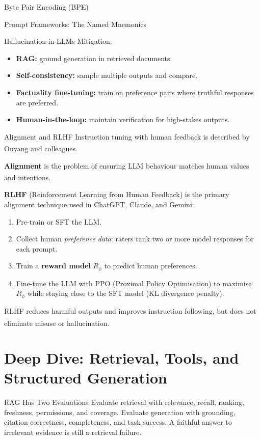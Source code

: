 \begin{v3topic}{Byte Pair Encoding (BPE)}
\begin{v3topic}{Prompt Frameworks: The Named Mnemonics}
\begin{v3topic}{Hallucination in LLMs}
    Mitigation:
    \begin{itemize}
        \item \textbf{RAG:} ground generation in retrieved documents.
        \item \textbf{Self-consistency:} sample multiple outputs and compare.
        \item \textbf{Factuality fine-tuning:} train on preference pairs where truthful
              responses are preferred.
        \item \textbf{Human-in-the-loop:} maintain verification for high-stakes outputs.
    \end{itemize}

\end{v3topic}
\begin{v3topic}{Alignment and RLHF}
    Instruction tuning with human feedback is described by Ouyang and
    colleagues\textsuperscript{\cite{ouyangTrainingLanguageModels2022}}.

    \textbf{Alignment} is the problem of ensuring LLM behaviour matches human values and
    intentions.\textsuperscript{\cite[][p.~73]{farrisHowLargeLanguage2025}}

    \textbf{RLHF} (Reinforcement Learning from Human Feedback) is the primary alignment
    technique used in ChatGPT, Claude, and Gemini:

    \begin{enumerate}
        \item Pre-train or SFT the LLM.
        \item Collect human \emph{preference data}: raters rank two or more model
              responses for each prompt.
        \item Train a \textbf{reward model} $R_\phi$ to predict human preferences.
        \item Fine-tune the LLM with PPO (Proximal Policy Optimisation) to maximise
              $R_\phi$ while staying close to the SFT model (KL divergence penalty).
    \end{enumerate}

    RLHF reduces harmful outputs and improves instruction following, but does not
    eliminate misuse or
    hallucination.\textsuperscript{\cite[][p.~73-74]{farrisHowLargeLanguage2025}}

\end{v3topic}

%
\section{Deep Dive: Retrieval, Tools, and Structured Generation}
\begin{v3topic}{RAG Has Two Evaluations}
Evaluate retrieval with relevance, recall, ranking, freshness, permissions, and
coverage.
Evaluate generation with grounding, citation correctness, completeness, and
task success.
A faithful answer to irrelevant evidence is still a retrieval failure.


\end{v3topic}
\end{v3topic}
\end{v3topic}

